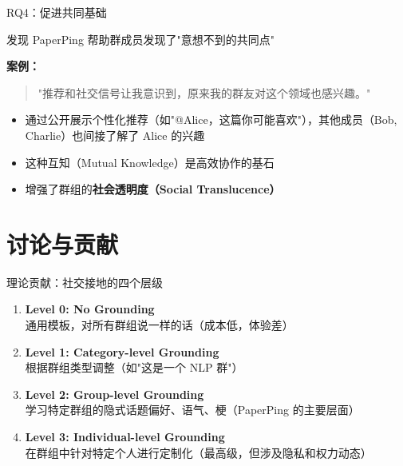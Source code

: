 \documentclass[UTF8,aspectratio=169]{ctexbeamer}
\begin{document}
\begin{frame}{RQ4：促进共同基础}
\begin{block}{发现}
PaperPing 帮助群成员发现了"意想不到的共同点"
\end{block}

\vspace{0.3cm}

\textbf{案例：}
\begin{quote}
"推荐和社交信号让我意识到，原来我的群友对这个领域也感兴趣。"
\end{quote}

\vspace{0.3cm}

\begin{itemize}
\item 通过公开展示个性化推荐（如"@Alice，这篇你可能喜欢"），其他成员（Bob, Charlie）也间接了解了 Alice 的兴趣
\item 这种\textcolor{myblue}{互知（Mutual Knowledge）}是高效协作的基石
\item 增强了群组的\textbf{社会透明度（Social Translucence）}
\end{itemize}
\end{frame}

\section{讨论与贡献}

\begin{frame}{理论贡献：社交接地的四个层级}
\begin{enumerate}
\item \textbf{Level 0: No Grounding} \\
  通用模板，对所有群组说一样的话（成本低，体验差）

\vspace{0.2cm}

\item \textbf{Level 1: Category-level Grounding} \\
  根据群组类型调整（如"这是一个 NLP 群"）

\vspace{0.2cm}

\item \textbf{Level 2: Group-level Grounding} \\
  学习特定群组的隐式话题偏好、语气、梗（PaperPing 的主要层面）

\vspace{0.2cm}

\item \textbf{Level 3: Individual-level Grounding} \\
  在群组中针对特定个人进行定制化（最高级，但涉及隐私和权力动态）
\end{enumerate}
\end{frame}
\end{document}
